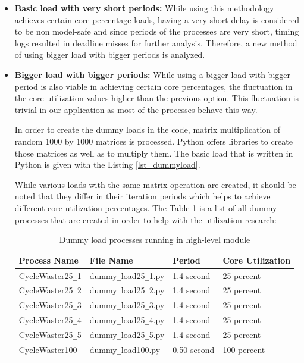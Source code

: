 \begin{itemize}
	\item \textbf{Basic load with very short periods:} While using this methodology achieves certain core percentage loads, having a very short delay is considered to be non model-safe and since periods of the processes are very short, timing logs resulted in deadline misses for further analysis. Therefore, a new method of using bigger load with bigger periods is analyzed.
	
	\item \textbf{Bigger load with bigger periods:} While using a bigger load with bigger period is also viable in achieving certain core percentages, the fluctuation in the core utilization values higher than the previous option. This fluctuation is trivial in our application as most of the processes behave this way.
	
	
	
	In order to create the dummy loads in the code, matrix multiplication of random 1000 by 1000 matrices is processed. Python offers libraries to create those matrices as well as to multiply them. The basic load that is written in Python is given with the Listing \ref{lst_dummyload}.
	
	While various loads with the same matrix operation are created, it should be noted that they differ in their iteration periods which helps to achieve different core utilization percentages. The Table \ref{tbl_dummyloads} is a list of all dummy processes that are created in order to help with the utilization research:
	
	\begin{table}[h!]
		\begin{tabular}{|l|l|l|l|}
			\hline
			Process Name & File Name & Period & Core Utilization \\
			\hline
			\hline
			CycleWaster25\texttt{\_}1 & dummy\texttt{\_}load25\texttt{\_}1.py & 1.4 second & 25 percent \\
			\hline
			CycleWaster25\texttt{\_}2 & dummy\texttt{\_}load25\texttt{\_}2.py & 1.4 second &  25 percent \\
			\hline
			CycleWaster25\texttt{\_}3 & dummy\texttt{\_}load25\texttt{\_}3.py & 1.4 second &  25 percent \\
			\hline
			CycleWaster25\texttt{\_}4 & dummy\texttt{\_}load25\texttt{\_}4.py & 1.4 second &  25 percent \\
			\hline
			CycleWaster25\texttt{\_}5 & dummy\texttt{\_}load25\texttt{\_}5.py & 1.4 second &  25 percent \\
			\hline
			CycleWaster100 & dummy\texttt{\_}load100.py & 0.50 second & 100 percent \\
			\hline
		\end{tabular}
		\caption{Dummy load processes running in high-level module}
		\label{tbl_dummyloads}
	\end{table}
	
\end{itemize}

